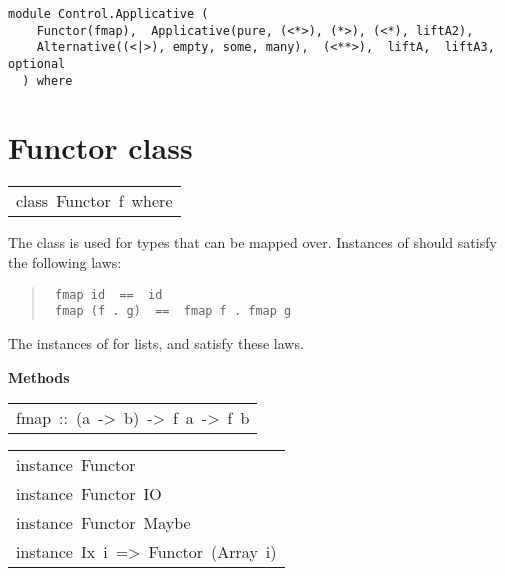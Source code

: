 \label{module:Control.Applicative}
\haddockbeginheader
{\haddockverb\begin{verbatim}
module Control.Applicative (
    Functor(fmap),  Applicative(pure, (<*>), (*>), (<*), liftA2), 
    Alternative((<|>), empty, some, many),  (<**>),  liftA,  liftA3,  optional
  ) where\end{verbatim}}
\haddockendheader

\section{Functor class
}
\begin{haddockdesc}
\item[\begin{tabular}{@{}l}
class\ Functor\ f\ where
\end{tabular}]\haddockbegindoc
The  class is used for types that can be mapped over.
Instances of  should satisfy the following laws:
\par
\begin{quote}
{\haddockverb\begin{verbatim}
 fmap id  ==  id
 fmap (f . g)  ==  fmap f . fmap g
\end{verbatim}}
\end{quote}
The instances of  for lists,  and 
satisfy these laws.
\par

\haddockpremethods{}\textbf{Methods}
\begin{haddockdesc}
\item[\begin{tabular}{@{}l}
fmap\ ::\ (a\ ->\ b)\ ->\ f\ a\ ->\ f\ b
\end{tabular}]
\end{haddockdesc}
\end{haddockdesc}
\begin{haddockdesc}
\item[\begin{tabular}{@{}l}
instance\ Functor\ {\char 91}{\char 93}\\instance\ Functor\ IO\\instance\ Functor\ Maybe\\instance\ Ix\ i\ =>\ Functor\ (Array\ i)
\end{tabular}]
\end{haddockdesc}

